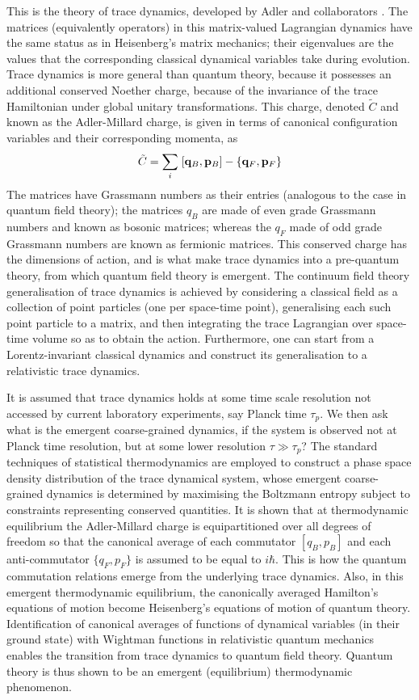 \documentclass[a4paper]{jpconf}
\begin{document}
This is the theory of trace dynamics, developed by Adler and collaborators \cite{Adler1, Adler2}. The matrices (equivalently operators) in this matrix-valued Lagrangian dynamics have the same status as in Heisenberg's matrix mechanics; their eigenvalues are the values that the corresponding classical dynamical variables take during evolution. Trace dynamics is more general than quantum theory, because it possesses an additional conserved Noether charge, because of the invariance of the trace Hamiltonian under global unitary transformations. This charge, denoted $\tilde{C}$ and  known as the Adler-Millard charge, is given in terms of canonical configuration variables and their corresponding momenta, as
\begin{equation}
\tilde{C} = \sum_i \; [{\bf q}_B, {\bf p}_B] -\left\{{\bf q}_F,{\bf p}_F\right\}
\end{equation}
The matrices have Grassmann numbers as their entries (analogous to the case in quantum field theory); the matrices $q_B$ are made of even grade Grassmann numbers and known as bosonic matrices; whereas the $q_F$ made of odd grade Grassmann numbers are known as fermionic matrices. This conserved charge has the dimensions of action, and is what make trace dynamics  into a 
pre-quantum theory, from which quantum field theory is emergent. The continuum field theory generalisation of trace dynamics is achieved by considering a classical field as a collection of point particles (one per space-time point), generalising each such point particle to a matrix, and then integrating the trace Lagrangian over space-time volume so as to obtain the action. Furthermore, one can start from a Lorentz-invariant classical dynamics and construct its generalisation to a relativistic trace dynamics.

It is assumed that trace dynamics holds at some time scale resolution not accessed by current 
laboratory experiments, say Planck time $\tau_{p}$. We then ask what is the emergent coarse-grained dynamics, if the system is observed not at Planck time resolution, but at some lower resolution $\tau\gg \tau_p$? The standard techniques of statistical thermodynamics are employed to construct a phase space density distribution of the trace dynamical system, whose emergent coarse-grained dynamics is determined by maximising the Boltzmann entropy subject to constraints representing conserved quantities. It is shown that at thermodynamic equilibrium the Adler-Millard charge is equipartitioned over all degrees of freedom so that the canonical average of each commutator $[q_B, p_B]$ and each 
anti-commutator $\{q_F, p_F\}$ is assumed to be equal to $i\hbar$. This is how the quantum commutation relations emerge from the underlying trace dynamics. Also, in this emergent thermodynamic equilibrium, the canonically averaged Hamilton's equations of motion become Heisenberg's equations of motion of quantum theory. Identification of canonical averages of functions of dynamical variables (in their ground state) with Wightman functions in relativistic quantum mechanics enables the transition from trace dynamics to quantum  field theory. Quantum theory is thus shown to be an emergent (equilibrium) thermodynamic phenomenon.
\end{document}
